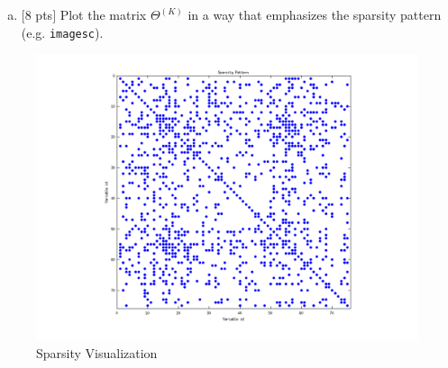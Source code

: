 \documentclass[12pt]{article}
\begin{document}
\begin{enumerate}[(e)]
\item $[$8 pts$]$  Plot the matrix $\Theta^{(K)}$ in a way that emphasizes the sparsity pattern (e.g. \texttt{imagesc}).
\end{enumerate}


\begin{figure}[h!]
  \centering
    \includegraphics[width=\textwidth]{sp}
  \caption{Sparsity Visualization}
\end{figure}
\end{document}
